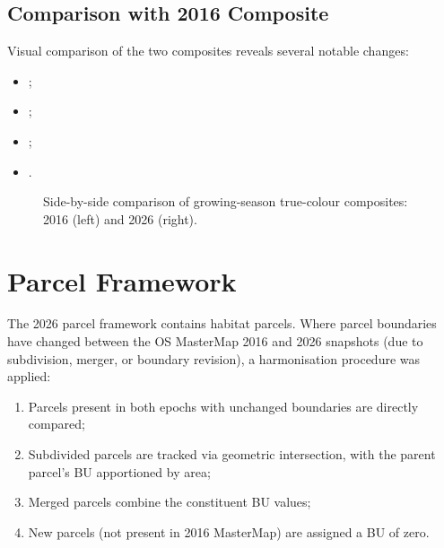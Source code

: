 \subsection{Comparison with 2016 Composite}

Visual comparison of the two composites reveals several notable changes:

\begin{itemize}[nosep]
  \item {};
  \item {};
  \item {};
  \item {}.
\end{itemize}

\begin{figure}[H]
\centering
{}
\caption{Side-by-side comparison of growing-season true-colour composites: 2016 (left) and 2026 (right).}
\label{fig:composite-comparison}
\end{figure}


\section{Parcel Framework}

The 2026 parcel framework contains  habitat parcels. Where parcel boundaries have changed between the OS MasterMap 2016 and 2026 snapshots (due to subdivision, merger, or boundary revision), a harmonisation procedure was applied:

\begin{enumerate}[nosep]
  \item Parcels present in both epochs with unchanged boundaries are directly compared;
  \item Subdivided parcels are tracked via geometric intersection, with the parent parcel's \Tzero{} BU apportioned by area;
  \item Merged parcels combine the constituent \Tzero{} BU values;
  \item New parcels (not present in 2016 MasterMap) are assigned a \Tzero{} BU of zero.
\end{enumerate}

